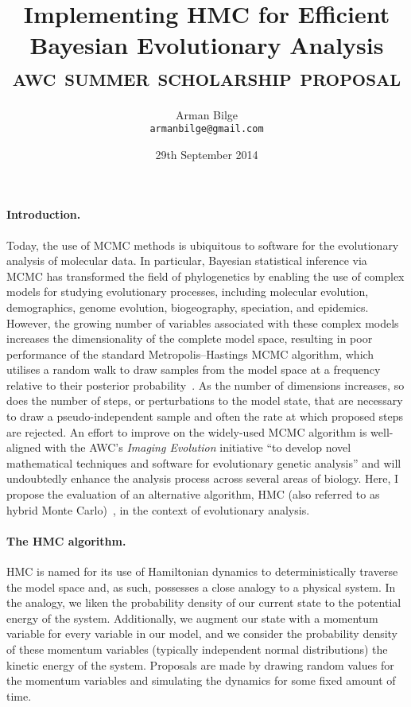 \documentclass{article}
\title{Implementing \acl{HMC} for Efficient Bayesian Evolutionary Analysis \\
           \Large\textsc{awc summer scholarship proposal}}
\author{Arman Bilge \\ \texttt{armanbilge@gmail.com}}
\date{29th September 2014}
\begin{document}
    \maketitle

    \paragraph{Introduction.}

    Today, the use of \ac{MCMC} methods is ubiquitous to software for the
        evolutionary analysis of molecular data.
    In particular, Bayesian statistical inference via \ac{MCMC} has transformed
        the field of phylogenetics by enabling the use of complex models for
        studying evolutionary processes, including molecular evolution,
        demographics, genome evolution, biogeography, speciation, and
        epidemics.
    However, the growing number of variables associated with these complex
        models increases the dimensionality of the complete model space,
        resulting in poor performance of the standard Metropolis--Hastings MCMC
        algorithm, which utilises a random walk to draw samples from the model
        space at a frequency relative to their posterior
        probability~\cite{Met+53,Has70}.
    As the number of dimensions increases, so does the number of steps, or
        perturbations to the model state, that are necessary to draw a
        pseudo-independent sample and often the rate at which proposed steps
        are rejected.
    An effort to improve on the widely-used \ac{MCMC} algorithm is well-aligned
        with the \acl{AWC}'s \emph{Imaging Evolution} initiative \enquote{to
        develop novel mathematical techniques and software for evolutionary
        genetic analysis} and will undoubtedly enhance the analysis process
        across several areas of biology.
    Here, I propose the evaluation of an alternative algorithm, \ac{HMC} (also
        referred to as hybrid Monte Carlo)~\cite{Nea11}, in the context of
        evolutionary analysis.

    \paragraph*{The \ac{HMC} algorithm.}

    \ac{HMC} is named for its use of Hamiltonian dynamics to deterministically
        traverse the model space and, as such, possesses a close analogy to a
        physical system.
    In the analogy, we liken the probability density of our current state to
        the potential energy of the system.
    Additionally, we augment our state with a momentum variable for every
        variable in our model, and we consider the probability density of these
        momentum variables (typically independent normal distributions) the
        kinetic energy of the system.
    Proposals are made by drawing random values for the momentum variables
        and simulating the dynamics for some fixed amount of time.
\end{document}
